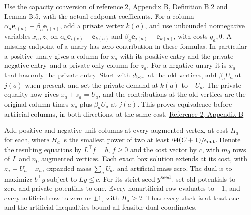 \documentclass[11pt]{article}
\begin{document}
Use the capacity conversion of reference 2, Appendix B, Definition B.2 and Lemma B.5, with the actual endpoint coefficients. For a column \(\alpha_a\mathbf e_{i(a)}-\beta_a\mathbf e_{j(a)}\), add a private vertex \(k(a)\), and use unbounded nonnegative variables \(x_a,z_a\) on \(\alpha_a\mathbf e_{i(a)}-\mathbf e_{k(a)}\) and \(\beta_a\mathbf e_{j(a)}-\mathbf e_{k(a)}\), with costs \(q_a,0\). A missing endpoint of a unary has zero contribution in these formulas. In particular a positive unary gives a column for \(x_a\) with its positive entry and the private negative entry, and a private-only column for \(z_a\). For a negative unary it is \(x_a\) that has only the private entry. Start with \(d_{\rm box}\) at the old vertices, add \(\beta_a U_a\) at \(j(a)\) when present, and set the private demand at \(k(a)\) to \(-U_a\). The private equality now gives \(x_a+z_a=U_a\), and the contributions at the old vertices are the original column times \(x_a\) plus \(\beta_a U_a\) at \(j(a)\). This proves equivalence before artificial columns, in both directions, at the same cost. \href{https://arxiv.org/pdf/2407.10830}{Reference 2, Appendix B}

Add positive and negative unit columns at every augmented vertex, at cost \(H_a\) for each, where \(H_a\) is the smallest power of two at least \(64(C+1)/\epsilon_{\rm out}\). Denote the resulting equations by \(L^\top f=b,\ f\ge0\) and the cost vector by \(c\), with \(m_0\) rows of \(L\) and \(n_0\) augmented vertices. Each exact box solution extends at its cost, with \(z_a=U_a-x_a\), expanded mass \(\sum_a U_a\), and artificial mass zero. The dual is to maximize \(b^\top y\) subject to \(Ly\le c\). For its strict seed \(y^{\rm seed}\), set old potentials to zero and private potentials to one. Every nonartificial row evaluates to \(-1\), and every artificial row to zero or \(\pm1\), with \(H_a\ge2\). Thus every slack is at least one and the artificial inequalities bound all feasible dual coordinates.
\end{document}

